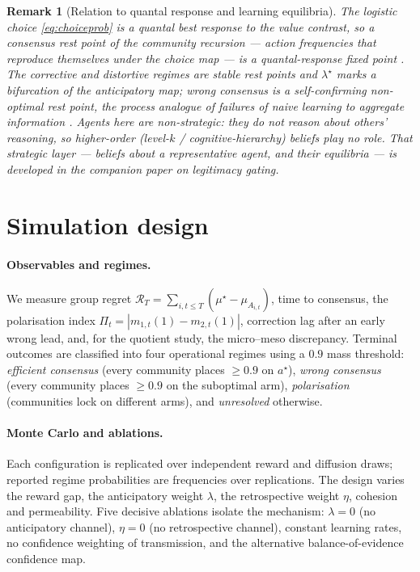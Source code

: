 \documentclass[11pt]{article}
\newtheorem{remark}{Remark}
\newcommand{\1}{\mathbf{1}}
\begin{document}
\begin{remark}[Relation to quantal response and learning equilibria]
\label{rem:qre}
The logistic choice \eqref{eq:choiceprob} is a quantal best response to the value
contrast, so a consensus rest point of the community recursion --- action
frequencies that reproduce themselves under the choice map --- is a
quantal-response fixed point \citep{McKelveyPalfrey1995}. The corrective and
distortive regimes are stable rest points and $\lambda^\star$ marks a
bifurcation of the anticipatory map; wrong consensus is a self-confirming
non-optimal rest point, the process analogue of failures of naive learning to
aggregate information \citep{GolubJackson2010}. Agents here are non-strategic:
they do not reason about others' reasoning, so higher-order (level-$k$ /
cognitive-hierarchy) beliefs play no role. That strategic layer --- beliefs about
a representative agent, and their equilibria --- is developed in the companion
paper on legitimacy gating.
\end{remark}

\section{Simulation design}
\label{sec:design}

\paragraph{Observables and regimes.}
We measure group regret
$\mathcal R_T=\sum_{i,t\le T}(\mu^\star-\mu_{A_{i,t}})$, time to consensus, the
polarisation index $\Pi_t=|m_{1,t}(1)-m_{2,t}(1)|$, correction lag after an
early wrong lead, and, for the quotient study, the micro--meso discrepancy.
Terminal outcomes are classified into four operational regimes using a $0.9$
mass threshold: \emph{efficient consensus} (every community places
$\ge0.9$ on $a^\star$), \emph{wrong consensus} (every community places $\ge0.9$
on the suboptimal arm), \emph{polarisation} (communities lock on different
arms), and \emph{unresolved} otherwise.

\paragraph{Monte Carlo and ablations.}
Each configuration is replicated over independent reward and diffusion draws;
reported regime probabilities are frequencies over replications. The design
varies the reward gap, the anticipatory weight $\lambda$, the retrospective
weight $\eta$, cohesion and permeability. Five decisive ablations isolate the
mechanism: $\lambda=0$ (no anticipatory channel), $\eta=0$ (no retrospective
channel), constant learning rates, no confidence weighting of transmission, and
the alternative balance-of-evidence confidence map.
\end{document}
